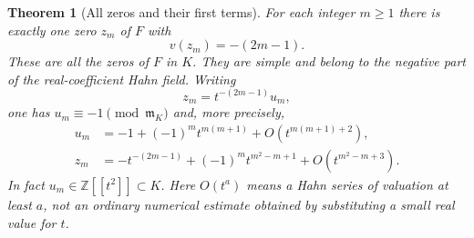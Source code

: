 \documentclass[11pt,a4paper]{article}
\numberwithin{equation}{section}
\newtheorem{theorem}{Theorem}[section]
\theoremstyle{definition}
\theoremstyle{remark}
\newcommand{\Z}{\mathbb Z}
\newcommand{\mm}{\mathfrak m}
\begin{document}
\begin{theorem}[All zeros and their first terms]\label{thm:thetazeros}
For each integer $m\ge1$ there is exactly one zero $z_m$ of $F$ with
\begin{equation}\label{eq:zerovaluation}
 v(z_m)=-(2m-1).
\end{equation}
These are all the zeros of $F$ in $K$. They are simple and belong to the
negative part of the real-coefficient Hahn field. Writing
\[
 z_m=t^{-(2m-1)}u_m,
\]
one has $u_m\equiv-1\pmod{\mm_K}$ and, more precisely,
\begin{align}
 u_m&=-1+(-1)^m t^{m(m+1)}
              +O\!\left(t^{m(m+1)+2}\right),\label{eq:unormexp}\\
 z_m&=-t^{-(2m-1)}+(-1)^m t^{m^2-m+1}
              +O\!\left(t^{m^2-m+3}\right).\label{eq:zexp}
\end{align}
In fact $u_m\in\Z[[t^2]]\subset K$. Here $O(t^a)$ means a Hahn series of
valuation at least $a$, not an ordinary numerical estimate obtained by
substituting a small real value for $t$.
\end{theorem}
\end{document}
